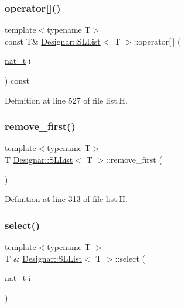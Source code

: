 \subsubsection{\texorpdfstring{operator[]()}{operator[]()}\hspace{0.1cm}{\footnotesize\ttfamily [2/2]}}
{\footnotesize\ttfamily template$<$typename T$>$ \\
const T\& \hyperlink{class_designar_1_1_s_l_list}{Designar\+::\+S\+L\+List}$<$ T $>$\+::operator\mbox{[}$\,$\mbox{]} (\begin{DoxyParamCaption}\item[{\hyperlink{namespace_designar_aa72662848b9f4815e7bf31a7cf3e33d1}{nat\+\_\+t}}]{i }\end{DoxyParamCaption}) const\hspace{0.3cm}{\ttfamily [inline]}}



Definition at line 527 of file list.\+H.

\mbox{\label{class_designar_1_1_s_l_list_aedf1d4b4e8134748796a56e7d4ac9d11}} 
\subsubsection{\texorpdfstring{remove\+\_\+first()}{remove\_first()}}
{\footnotesize\ttfamily template$<$typename T$>$ \\
T \hyperlink{class_designar_1_1_s_l_list}{Designar\+::\+S\+L\+List}$<$ T $>$\+::remove\+\_\+first (\begin{DoxyParamCaption}{ }\end{DoxyParamCaption})\hspace{0.3cm}{\ttfamily [inline]}}



Definition at line 313 of file list.\+H.

\mbox{\label{class_designar_1_1_s_l_list_a5f9a0e22a762f23ab48db2e4d59d1a38}} 
\subsubsection{\texorpdfstring{select()}{select()}\hspace{0.1cm}{\footnotesize\ttfamily [1/2]}}
{\footnotesize\ttfamily template$<$typename T $>$ \\
T \& \hyperlink{class_designar_1_1_s_l_list}{Designar\+::\+S\+L\+List}$<$ T $>$\+::select (\begin{DoxyParamCaption}\item[{\hyperlink{namespace_designar_aa72662848b9f4815e7bf31a7cf3e33d1}{nat\+\_\+t}}]{i }\end{DoxyParamCaption})}



